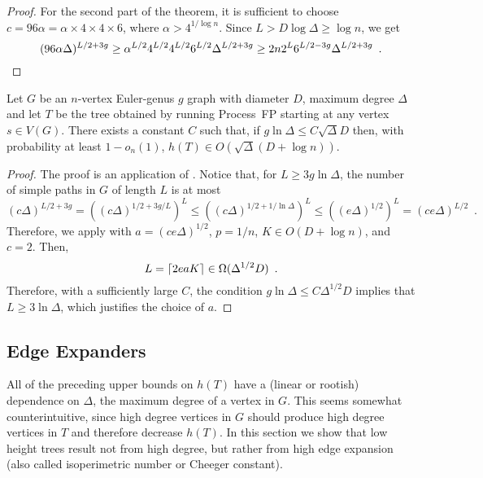 \documentclass{patmorin}
\begin{document}
\begin{proof}
   For the second part of the theorem, it is sufficient to choose $c=96\alpha=\alpha\times 4\times4\times 6$, where $\alpha > 4^{1/\log n}$.  Since $L>D\log \Delta \ge \log n$, we get
   \[
       (96\alpha\Delta)^{L/2+3g} 
        \ge \alpha^{L/2} 4^{L/2}4^{L/2} 6^{L/2} \Delta^{L/2+3g}
        \ge 2 n 2^{L} 6^{L/2-3g} \Delta^{L/2+3g} \enspace . \qedhere
   \]
\end{proof}


\begin{thm}
  Let $G$ be an $n$-vertex Euler-genus $g$ graph with diameter $D$,
  maximum degree $\Delta$ and let $T$ be the tree obtained by running
  Process~FP starting at any vertex $s\in V(G)$.  There exists a constant
  $C$ such that, if $g\ln\Delta \le C\sqrt{\Delta}D$ then,
  with probability at least $1-o_n(1)$,
  $h(T)\in O(\sqrt{\Delta}(D+\log n))$.
\end{thm}

\begin{proof}
  The proof is an application of .  Notice that,
  for $L\ge 3g\ln\Delta$, the number of simple paths in $G$ of length
  $L$ is at most
  \[
     (c\Delta)^{L/2+3g} 
        = \left((c\Delta)^{1/2+3g/L}\right)^L
        \le \left((c\Delta)^{1/2+1/\ln\Delta}\right)^L
        \le \left((e\Delta)^{1/2}\right)^L
        = (ce\Delta)^{L/2} \enspace .
  \]
  Therefore, we apply  with $a=(ce\Delta)^{1/2}$,
  $p=1/n$, $K\in O(D+\log n)$, and $c=2$.  Then,
  \[
      L={\lceil 2eaK \rceil} \in \Omega(\Delta^{1/2}D) \enspace .
  \]
  Therefore, with a sufficiently large $C$, the condition $g\ln\Delta \le C\Delta^{1/2}D$ implies that $L\ge 3\ln\Delta$, which justifies the choice of $a$.
\end{proof}

\subsection{Edge Expanders}

All of the preceding upper bounds on $h(T)$ have a (linear or rootish)
dependence on $\Delta$, the maximum degree of a vertex in $G$.
This seems somewhat counterintuitive, since high degree vertices in $G$
should produce high degree vertices in $T$ and therefore decrease $h(T)$.
In this section we show that low height trees result not from high degree,
but rather from high edge expansion (also called isoperimetric number
or Cheeger constant).
\end{document}
